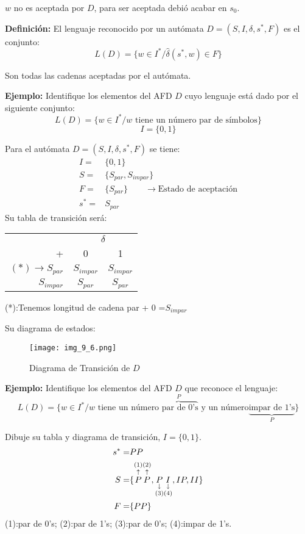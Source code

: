 $w$ no es aceptada por $D$, para ser aceptada debió acabar en $s_0$.

\textbf{Definición: }El lenguaje reconocido por un autómata $D=(S,I,\delta,s^*,F)$ es el conjunto:
$$L(D)=\{ w\in I^*/\widehat{\delta}(s^*,w)\in F\}$$

Son todas las cadenas aceptadas por el autómata.

\textbf{Ejemplo: }Identifique los elementos del AFD $D$ cuyo lenguaje está dado por el siguiente conjunto:
$$L(D)=\{ w\in I^*/ w \mbox{ tiene un número par de símbolos}\}$$
$$I=\{0,1\}$$

Para el autómata $D=(S,I,\delta,s^*,F)$ se tiene: 
\begin{align*}
I=&\{0,1\}	\\
S=&\{S_{par},S_{impar}\}	\\
F=&\{S_{par}\} \qquad \rightarrow\mbox{Estado de aceptación}	\\
s^*= &S_{par}
\end{align*}
Su tabla de transición será:
\begin{center}
\begin{tabular}{r|cc}
	&\multicolumn{2}{c}{$\delta$}	\\
+	&0		&1	\\ \hline
$(*)\rightarrow S_{par}$	&$S_{impar}$	&$S_{impar}$	\\
$S_{impar}$	&$S_{par}$	&$S_{par}$

\end{tabular}
\end{center}
(*):Tenemos longitud de cadena par + $0$ =$S_{impar}$

Su diagrama de estados:

\begin{figure}[h!]
\centering
\texttt{[image: img\_9\_6.png]}
\caption{Diagrama de Transición de $D$}\label{img_9_6}
\end{figure}

\textbf{Ejemplo: }Identifique los elementos del AFD $D$ que reconoce el lenguaje:
$$L(D)=\{w\in I^*/ w \mbox{ tiene un número}\overbrace{\mbox{ par de 0's}}^{P}\mbox{ y un número} \underbrace{\mbox{impar de 1's}}_{P}\}$$

Dibuje su tabla y diagrama de transición, $I=\{0,1\}$.
\begin{align*}
s^*=&PP	\\
S=&\{\uplegend{P}{(1)}\uplegend{P}{(2)},\downlegend{P}{(3)}\downlegend{I}{(4)},IP,II\}	\\
F=&\{PP\}
\end{align*}
(1):par de 0's; (2):par de 1's; (3):par de 0's; (4):impar de 1's.

